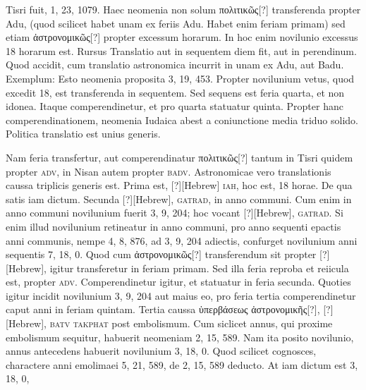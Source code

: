Tisri fuit, 1, 23, 1079.
Haec neomenia non solum \textgreek{πολιτικῶς[?]} transferenda
propter Adu, (quod scilicet habet unam ex feriis Adu.
Habet enim
feriam primam) sed etiam \textgreek{ἀστρονομικῶς[?]} propter excessum horarum.
In
hoc enim novilunio excessus 18 horarum est.
Rursus Translatio aut
in sequentem diem fit, aut in perendinum.
Quod accidit, cum translatio
astronomica incurrit in unam ex Adu, aut Badu.
Exemplum:
Esto neomenia proposita 3, 19, 453.
Propter novilunium vetus, quod
excedit 18, est transferenda in sequentem.
Sed sequens est feria quarta,
et non idonea.
Itaque comperendinetur, et pro quarta statuatur
quinta.
Propter hanc comperendinationem, neomenia Iudaica abest
a coniunctione media triduo solido.
Politica translatio est unius
generis.
\begin{table}[t]
  
\end{table}
Nam feria transfertur, aut comperendinatur
 \textgreek{πολιτικῶς[?]} tantum
in Tisri quidem propter \textsc{adv}, in Nisan autem propter \textsc{badv}.
%
Astronomicae vero translationis caussa triplicis generis est.
Prima est,
\texthebrew{[?]}[Hebrew] \textsc{iah}, hoc est, 18 horae.
De qua satis iam dictum.
Secunda \texthebrew{[?]}[Hebrew], \textsc{gatrad},
in anno communi.
Cum enim in anno communi novilunium
fuerit 3, 9, 204; hoc vocant \texthebrew{[?]}[Hebrew], \textsc{gatrad}.
Si enim illud novilunium
retineatur in anno communi, pro anno sequenti epactis anni communis,
nempe 4, 8, 876, ad 3, 9, 204 adiectis, confurget novilunium
anni sequentis 7, 18, 0.
Quod cum \textgreek{ἀστρονομικῶς[?]} transferendum sit
propter \texthebrew{[?]}[Hebrew], igitur transferetur in feriam primam.
Sed illa feria reproba
et reiicula est, propter \textsc{adv}.
Comperendinetur igitur, et statuatur
in feria secunda.
Quoties igitur incidit novilunium 3, 9, 204
aut maius eo, pro feria tertia comperendinetur caput anni in feriam
quintam.
Tertia caussa \textgreek{ὑπερβάσεως ἀστρονομικῆς[?]},
 \texthebrew{[?]}[Hebrew], \textsc{batv
takphat} post embolismum.
Cum siclicet annus, qui proxime embolismum
sequitur, habuerit neomeniam 2, 15, 589.
Nam ita posito
novilunio, annus antecedens habuerit novilunium 3, 18, 0.
Quod scilicet
cognosces, charactere anni emolimaei 5, 21, 589, de 2, 15, 589
deducto.
At iam dictum est 3, 18, 0,
